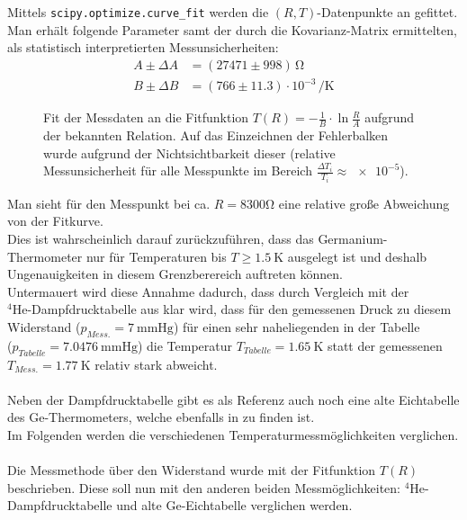 \documentclass[german,  %
parskip=full,  %
headsepline]{scrartcl}
\newcommand{\bcref}[1]{\namecref{#1} \textcolor{blue}{\labelcref{#1}}}
\begin{document}
Mittels \verb+scipy.optimize.curve_fit+ werden die $(R,T)$-Datenpunkte an \bcref{eq:T(R)} gefittet.\\
Man erhält folgende Parameter samt der durch die Kovarianz-Matrix ermittelten, als statistisch interpretierten Messunsicherheiten:
\begin{align*}
A\pm\Delta A&=(27471\pm998)\,\si{\ohm}\\
B\pm\Delta B&=(766\pm11.3)\cdot 10^{-3}\,\si{\per\kelvin}
\end{align*}
\begin{figure}[h!]
    \centering
    
    \caption{Fit der Messdaten an die Fitfunktion $T(R)=-\frac{1}{B}\cdot \ln{\frac{R}{A}}$ aufgrund der bekannten Relation. Auf das Einzeichnen der Fehlerbalken wurde aufgrund der Nichtsichtbarkeit dieser (relative Messunsicherheit für alle Messpunkte im Bereich $\frac{\Delta T_i}{T_i}\approx \num{e-5}$).}
    \label{fig:T(R)}
\end{figure}
Man sieht für den Messpunkt bei ca. $R=8300\si{\ohm}$ eine relative große Abweichung von der Fitkurve. \\
Dies ist wahrscheinlich darauf zurückzuführen, dass das Germanium-Thermometer nur für Temperaturen bis $T\ge\SI{1.5}{\kelvin}$ ausgelegt ist und deshalb Ungenauigkeiten in diesem Grenzberereich auftreten können.\\
Untermauert wird diese Annahme dadurch, dass durch Vergleich mit der\\ $^{4}$He-Dampfdrucktabelle aus \cite{Platzanleitung} klar wird, dass für den gemessenen Druck zu diesem Widerstand ($p_{Mess.}=\SI{7}{\mmHg}$) für einen sehr naheliegenden in der Tabelle \\($p_{Tabelle} = \SI{7,0476}{\mmHg}$) die Temperatur $T_{Tabelle}=\SI{1.65}{\kelvin}$ statt der gemessenen 
$T_{Mess.}=\SI{1.77}{\kelvin}$ relativ stark abweicht.\\\\
Neben der Dampfdrucktabelle gibt es als Referenz auch noch eine alte Eichtabelle des Ge-Thermometers, welche ebenfalls in \cite{Platzanleitung} zu finden ist.\\
Im Folgenden werden die verschiedenen Temperaturmessmöglichkeiten verglichen.\\\\
Die Messmethode über den Widerstand wurde mit der Fitfunktion $T(R)$ beschrieben. Diese soll nun mit den anderen beiden Messmöglichkeiten: $  ^{4}$He-Dampfdrucktabelle und alte Ge-Eichtabelle verglichen werden.\\
\end{document}
